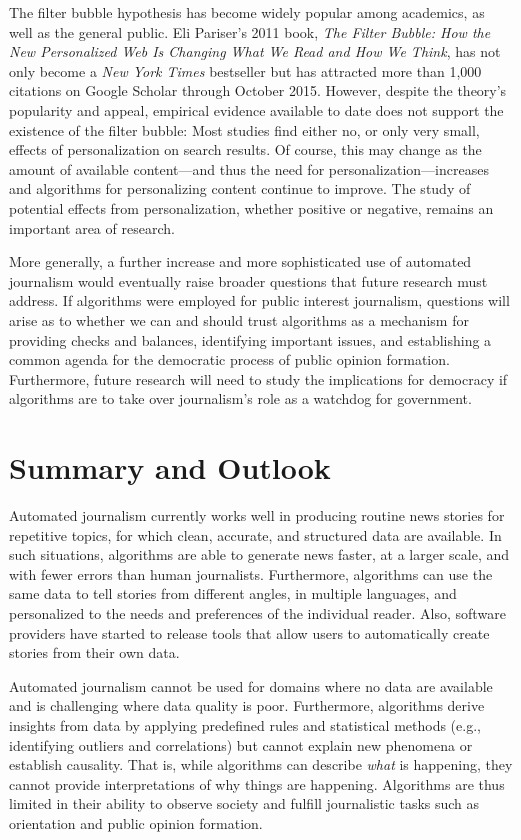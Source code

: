 \documentclass[notoc, symmetric, nobib, nols]{towcenter-book}
\begin{document}
The filter bubble hypothesis has become widely popular among academics, as well as the general public. Eli Pariser’s 2011 book, \textit{The Filter Bubble: How the New Personalized Web Is Changing What We Read and How We Think},\cite{paris11} has not only become a \textit{New York Times} bestseller but has attracted more than 1,000 citations on Google Scholar through October 2015. However, despite the theory’s popularity and appeal, empirical evidence available to date does not support the existence of the filter bubble: Most studies find either no, or only very small, effects of personalization on search results.\cite{bak15; flax15; haim15; feuz11} Of course, this may change as the amount of available content---and thus the need for personalization---increases and algorithms for personalizing content continue to improve. The study of potential effects from personalization, whether positive or negative, remains an important area of research.

More generally, a further increase and more sophisticated use of automated journalism would eventually raise broader questions that future research must address. If algorithms were employed for public interest journalism, questions will arise as to whether we can and should trust algorithms as a mechanism for providing checks and balances, identifying important issues, and establishing a common agenda for the democratic process of public opinion formation. Furthermore, future research will need to study the implications for democracy if algorithms are to take over journalism’s role as a watchdog for government.  

\chapter{Summary and Outlook}

Automated journalism currently works well in producing routine news stories for repetitive topics, for which clean, accurate, and structured data are available. In such situations, algorithms are able to generate news faster, at a larger scale, and with fewer errors than human journalists. Furthermore, algorithms can use the same data to tell stories from different angles, in multiple languages, and personalized to the needs and preferences of the individual reader. Also, software providers have started to release tools that allow users to automatically create stories from their own data.

Automated journalism cannot be used for domains where no data are available and is challenging where data quality is poor. Furthermore, algorithms derive insights from data by applying predefined rules and statistical methods (e.g., identifying outliers and correlations) but cannot explain new phenomena or establish causality. That is, while algorithms can describe \textit{what} is happening, they cannot provide interpretations of why things are happening. Algorithms are thus limited in their ability to observe society and fulfill journalistic tasks such as orientation and public opinion formation. 
\end{document}

